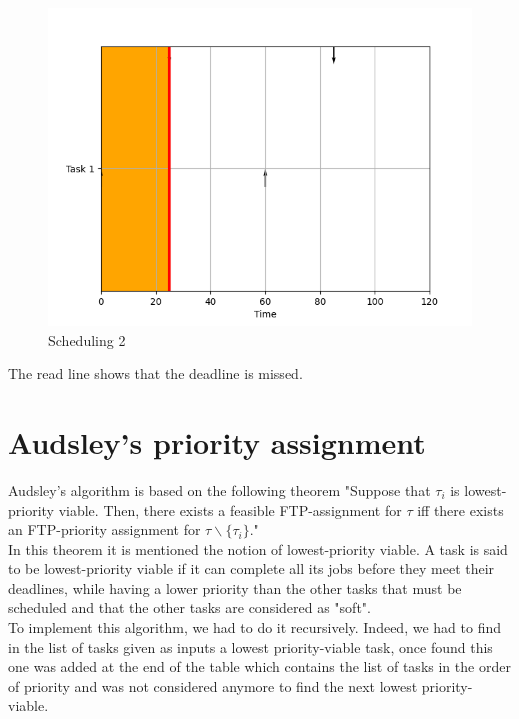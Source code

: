 \documentclass[a4paper,12pt]{article}
\begin{document}
\begin{figure}[h!]
  \centering
  \includegraphics[width=1\textwidth]{Resources_tex/Pictures/Figure_2.png}
  \caption{Scheduling 2}
  \label{fig: Scheduling 2}
\end{figure}
\noindent
 The read line shows that the deadline is missed. 
 
\newpage
\section{Audsley’s priority assignment}
Audsley's algorithm is based on the following theorem "Suppose that $\tau_i$ is lowest-priority viable. Then, there exists a feasible FTP-assignment for $\tau$ iff there exists an FTP-priority assignment for $\tau\backslash \{\tau_i\}$." \\

\smallskip
\noindent
In this theorem it is mentioned the notion of lowest-priority viable. A task is said to be lowest-priority viable if it can complete all its jobs before they meet their deadlines, while having a lower priority than the other tasks that must be scheduled and that the other tasks are considered as "soft".\\

\smallskip
\noindent
To implement this algorithm, we had to do it recursively. Indeed, we had to find in the list of tasks given as inputs a lowest priority-viable task, once found this one was added at the end of the table which contains the list of tasks in the order of priority and was not considered anymore to find the next lowest priority-viable.\\
\end{document}
